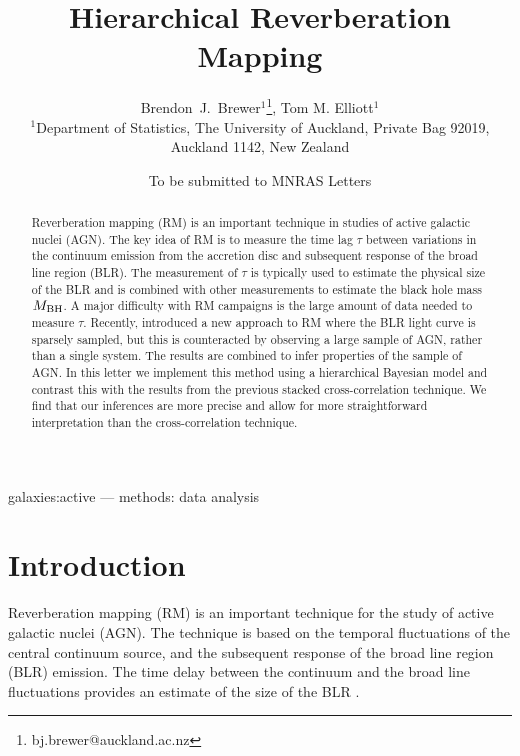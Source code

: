 \documentclass[useAMS,usenatbib]{mn2e}
\title[Hierarchical Reverberation Mapping]
{Hierarchical Reverberation Mapping}
\author[Brewer and Elliott]{%
  Brendon~J.~Brewer$^{1}$\thanks{bj.brewer@auckland.ac.nz},
  Tom M. Elliott$^{1}$
  \medskip\\
  $^1$Department of Statistics, The University of Auckland, Private Bag 92019, Auckland 1142, New Zealand}
\begin{document}
             
\date{To be submitted to MNRAS Letters}
             
\maketitle

\label{firstpage}


\begin{abstract}
Reverberation mapping (RM) is an important technique in studies of active
galactic nuclei (AGN). The key idea of RM is to measure the time lag $\tau$
between variations in the continuum emission from the accretion disc
and subsequent response of the broad line region (BLR). The measurement of
$\tau$ is typically used to estimate the physical size of the BLR and is
combined with other measurements to estimate the black hole mass $M_{\rm BH}$.
A major difficulty with RM campaigns is the large amount of data needed to
measure $\tau$. Recently, \citet{2012MNRAS.427.2701F} introduced a new approach
to RM where the BLR light curve is sparsely sampled, but this is counteracted
by observing a large sample of AGN, rather than a single system.
The results are combined to infer properties of the sample of
AGN. In this letter we implement this method using a hierarchical
Bayesian model and contrast this with the results from the previous stacked
cross-correlation technique. We find that our inferences are more precise and
allow for more straightforward interpretation than the cross-correlation
technique.
\end{abstract}

\begin{keywords}
galaxies:active --- methods: data analysis
\end{keywords}


\section{Introduction}
Reverberation mapping (RM) is an important technique for the study
of active galactic nuclei (AGN). The technique is based on the temporal
fluctuations of the central continuum source, and the subsequent response
of the broad line region (BLR) emission. The time delay between the continuum
and the broad line fluctuations provides an estimate of the size of the BLR
\citep{peterson}.
\end{document}

